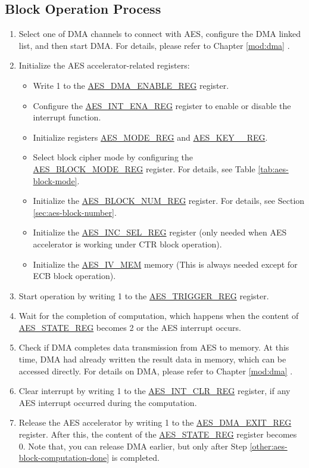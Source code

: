 \documentclass[main\_\_EN.tex]{subfiles}
\begin{document}
\subsection{Block Operation Process}
\begin{enumerate}
    \item Select one of DMA channels to connect with AES, configure the DMA linked list, and then start DMA. For details, please refer to Chapter \ref{mod:dma} \textit{}.
    \item Initialize the AES accelerator-related registers:
    \begin{itemize}
        \item Write 1 to the \hyperref[regdesc:AESDMAENABLEREG]{AES\_DMA\_ENABLE\_REG} register.
        \item Configure the \hyperref[regdesc:AESINTENAREG]{AES\_INT\_ENA\_REG} register to enable or disable the interrupt function.
        \item Initialize registers \hyperref[regdesc:AESMODEREG]{AES\_MODE\_REG} and \hyperref[regdesc:AESKEYnREG]{AES\_KEY\_\_REG}.
        \item Select block cipher mode by configuring the \hyperref[regdesc:AESBLOCKMODEREG]{AES\_BLOCK\_MODE\_REG} register. For details, see Table \ref{tab:aes-block-mode}.
        \item Initialize the \hyperref[regdesc:AESBLOCKNUMREG]{AES\_BLOCK\_NUM\_REG} register. For details, see Section \ref{sec:aes-block-number}.
        \item Initialize the \hyperref[regdesc:AESINCSELREG]{AES\_INC\_SEL\_REG} register (only needed when AES accelerator is working under CTR block operation).
        \item Initialize the \hyperref[memdesc:AESIVMEM]{AES\_IV\_MEM} memory (This is always needed except for ECB block operation).
    \end{itemize}
    \item Start operation by writing 1 to the \hyperref[regdesc:AESTRIGGERREG]{AES\_TRIGGER\_REG} register.
    \item \label{other:aes-block-computation-done} Wait for the completion of computation, which happens when the content of \hyperref[regdesc:AESSTATEREG]{AES\_STATE\_REG} becomes 2 or the AES interrupt occurs.
    \item Check if DMA completes data transmission from AES to memory. At this time, DMA had already written the result data in memory, which can be accessed directly. For details on DMA, please refer to Chapter \ref{mod:dma} \textit{}.
    \item Clear interrupt by writing 1 to the \hyperref[regdesc:AESINTCLRREG]{AES\_INT\_CLR\_REG} register, if any AES interrupt occurred during the computation.
    \item Release the AES accelerator by writing 1 to the \hyperref[regdesc:AESDMAEXITREG]{AES\_DMA\_EXIT\_REG} register. After this, the content of the \hyperref[regdesc:AESSTATEREG]{AES\_STATE\_REG} register becomes 0.
    Note that, you can release DMA earlier, but only after Step \ref{other:aes-block-computation-done} is completed.
\end{enumerate}
\end{document}
